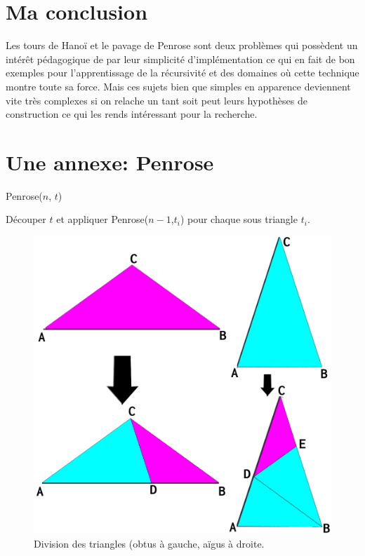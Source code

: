 \documentclass[a4paper,13pt]{article}
\begin{document}
\section{Ma conclusion}
 
Les tours de Hanoï et le pavage de Penrose sont deux problèmes qui possèdent un intérêt pédagogique de par leur simplicité d'implémentation ce qui en fait de bon exemples pour l'apprentissage de la récursivité et des domaines où cette technique montre toute sa force. Mais ces sujets bien que simples en apparence deviennent vite très complexes si on relache un tant soit peut leurs hypothèses de construction ce qui les rends intéressant pour la recherche.


\appendix
\section{Une annexe: Penrose}
\newpage
\begin{algorithm}[H]
\label{algo:penrose}
  \caption{Penrose($n$, $t$)}
  { Découper $t$ et appliquer Penrose($n-1$,$t_i$) pour chaque sous triangle $t_i$.
   }
\end{algorithm}
  
\begin{figure}
  \begin{center}
    \includegraphics[width=12cm]{triangle-generation1.png}
    \caption{Division des triangles (obtus à gauche, aïgus à droite.}
    \label{fig:decoupage1}
  \end{center}
\end{figure}
\end{document}

